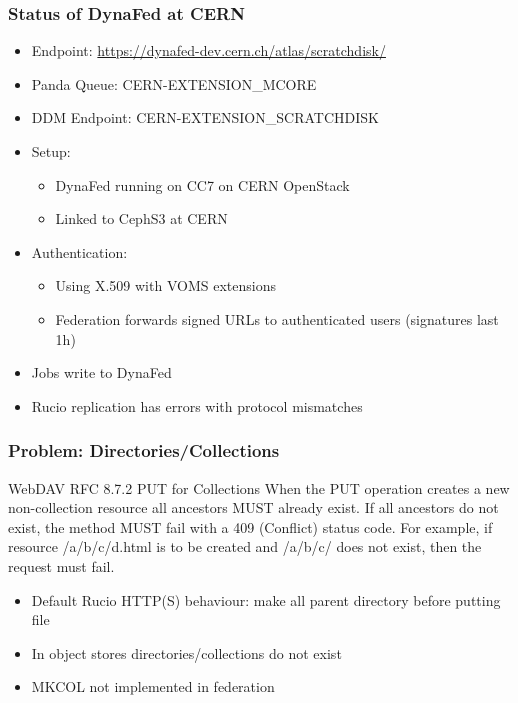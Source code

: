 \documentclass{beamer}
\begin{document}
\begin{frame}
  \frametitle{Status of DynaFed at CERN}
  \begin{itemize}
    \item Endpoint: \url{https://dynafed-dev.cern.ch/atlas/scratchdisk/}
    \item Panda Queue: CERN-EXTENSION\_MCORE
		\item DDM Endpoint: CERN-EXTENSION\_SCRATCHDISK
    \item Setup:
    \begin{itemize}
      \item DynaFed running on CC7 on CERN OpenStack
      \item Linked to CephS3 at CERN
    \end{itemize}
		\item Authentication:
    \begin{itemize}
      \item Using X.509 with VOMS extensions
      \item Federation forwards signed URLs to authenticated users (signatures last 1h)
    \end{itemize}
    \item Jobs write to DynaFed
    \item Rucio replication has errors with protocol mismatches
  \end{itemize}
\end{frame}

\begin{frame}
  \frametitle{Problem: Directories/Collections}
  \begin{block}{WebDAV RFC 8.7.2 PUT for Collections}
    When the PUT operation creates a new non-collection resource all ancestors MUST already exist. If all ancestors do not exist, the method MUST fail with a 409 (Conflict) status code. For example, if resource /a/b/c/d.html is to be created and /a/b/c/ does not exist, then the request must fail.
  \end{block}
  \begin{itemize}
    \item<1- > Default Rucio HTTP(S) behaviour: make all parent directory before putting file
    \item<2- > In object stores directories/collections do not exist
    \item<2- > MKCOL not implemented in federation
  \end{itemize}
\end{frame}
\end{document}
